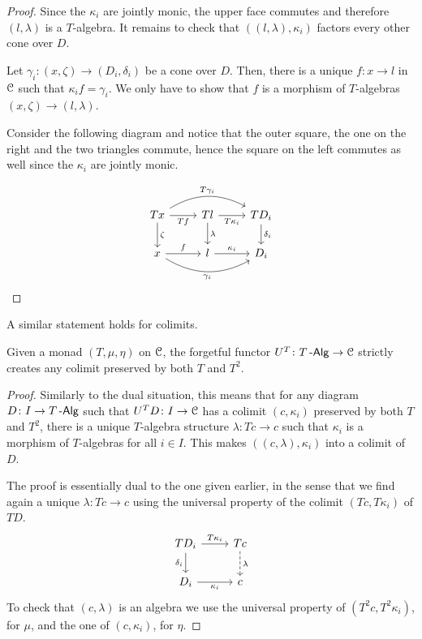 \documentclass[a4paper,11pt,oneside,openany]{scrbook}
\begin{document}
\begin{proof}
	Since the $\kappa_i$ are jointly monic, the upper face commutes and therefore $(l,\lambda)$ is a $T$-algebra. It remains to check that $((l,\lambda),\kappa_i)$ factors every other cone over $D$.
	
	Let $\gamma_i\colon(x,\zeta)\rightarrow (D_i,\delta_i)$ be a cone over $D$. Then, there is a unique $f\colon x\rightarrow l$ in $\operatorname{\mathcal{C}}$ such that $\kappa_if=\gamma_i$. We only have to show that $f$ is a morphism of $T$-algebras $(x,\zeta)\rightarrow (l,\lambda)$.
	
	Consider the following diagram and notice that the outer square, the one on the right and the two triangles commute, hence the square on the left commutes as well since the $\kappa_i$ are jointly monic.
	
	\[
		\begin{tikzcd}
			Tx\ar[rr, bend left, "T\gamma_i"]\ar[r, swap, "Tf"]\ar[d, "\zeta"]
			& Tl\ar[r, swap, "T\kappa_i"]\ar[d, "\lambda"]
			& TD_i\ar[d, "\delta_i"] \\
			x\ar[r, "f"]\ar[rr, bend right, swap, "\gamma_i"]
			& l\ar[r, "\kappa_i"]
			& D_i
		\end{tikzcd}
	\]
\end{proof}

A similar statement holds for colimits.

\begin{prop}\label{create colims}
Given a monad $(T,\mu,\eta)$ on $\operatorname{\mathcal{C}}$, the forgetful functor $U^T\colon T\operatorname{-\mathsf{Alg}}\rightarrow\operatorname{\mathcal{C}}$ strictly creates any colimit preserved by both $T$ and $T^2$.
\end{prop}

\begin{proof}
	Similarly to the dual situation, this means that for any diagram $D\colon I\rightarrow T\operatorname{-\mathsf{Alg}}$ such that $U^TD\colon I\rightarrow\operatorname{\mathcal{C}}$ has a colimit $(c,\kappa_i)$ preserved by both $T$ and $T^2$, there is a unique $T$-algebra structure $\lambda\colon Tc\rightarrow c$ such that $\kappa_i$ is a morphism of $T$-algebras for all $i\in I$. This makes $((c,\lambda),\kappa_i)$ into a colimit of $D$.
	
	The proof is essentially dual to the one given earlier, in the sense that we find again a unique $\lambda\colon Tc\rightarrow c$ using the universal property of the colimit $(Tc,T\kappa_i)$ of $TD$.
	\[
		\begin{tikzcd}
			TD_i\ar[r, "T\kappa_i"]\ar[d, "\delta_i"']
			& Tc\ar[d, dashed, "\lambda"] \\
			D_i\ar[r, "\kappa_i"']
			& c
		\end{tikzcd}
	\]
	To check that $(c,\lambda)$ is an algebra we use the universal property of $(T^2c,T^2\kappa_i)$, for $\mu$, and the one of $(c,\kappa_i)$, for $\eta$.
\end{proof}
\end{document}
